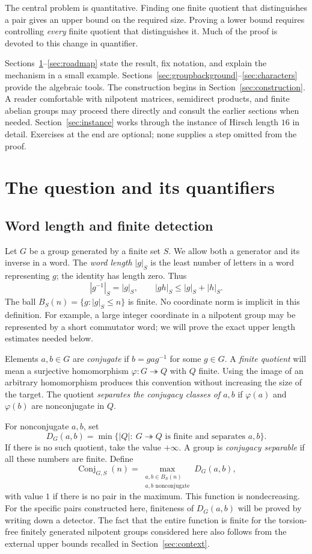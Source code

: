 \documentclass[11pt]{article}
\numberwithin{equation}{section}
\theoremstyle{definition}
\theoremstyle{remark}
\newcommand{\Conj}{\operatorname{Conj}}
\begin{document}
The central problem is quantitative. Finding one finite quotient that distinguishes a pair gives an upper bound on the required size. Proving a lower bound requires controlling \emph{every} finite quotient that distinguishes it. Much of the proof is devoted to this change in quantifier.

Sections~\ref{sec:question}--\ref{sec:roadmap} state the result, fix notation, and explain the mechanism in a small example. Sections~\ref{sec:groupbackground}--\ref{sec:characters} provide the algebraic tools. The construction begins in Section~\ref{sec:construction}. A reader comfortable with nilpotent matrices, semidirect products, and finite abelian groups may proceed there directly and consult the earlier sections when needed. Section~\ref{sec:instance} works through the instance of Hirsch length $16$ in detail. Exercises at the end are optional; none supplies a step omitted from the proof.

\tableofcontents

\section{The question and its quantifiers}\label{sec:question}
\subsection{Word length and finite detection}
Let $G$ be a group generated by a finite set $S$. We allow both a generator and its inverse in a word. The \emph{word length} $|g|_S$ is the least number of letters in a word representing $g$; the identity has length zero. Thus
\[
|g^{-1}|_S=|g|_S,\qquad |gh|_S\le |g|_S+|h|_S.
\]
The ball $B_S(n)=\{g:|g|_S\le n\}$ is finite. No coordinate norm is implicit in this definition. For example, a large integer coordinate in a nilpotent group may be represented by a short commutator word; we will prove the exact upper length estimates needed below.

Elements $a,b\in G$ are \emph{conjugate} if $b=gag^{-1}$ for some $g\in G$. A \emph{finite quotient} will mean a surjective homomorphism $\varphi:G\twoheadrightarrow Q$ with $Q$ finite. Using the image of an arbitrary homomorphism produces this convention without increasing the size of the target. The quotient \emph{separates the conjugacy classes of $a,b$} if $\varphi(a)$ and $\varphi(b)$ are nonconjugate in $Q$.

For nonconjugate $a,b$, set
\[
D_G(a,b)=\min\bigl\{|Q|:\ G\twoheadrightarrow Q\text{ is finite and separates }a,b\bigr\}.
\]
If there is no such quotient, take the value $+\infty$. A group is \emph{conjugacy separable} if all these numbers are finite. Define
\[
\Conj_{G,S}(n)=\max_{\substack{a,b\in B_S(n)\\a,b\text{ nonconjugate}}}D_G(a,b),
\]
with value $1$ if there is no pair in the maximum. This function is nondecreasing. For the specific pairs constructed here, finiteness of $D_G(a,b)$ will be proved by writing down a detector. The fact that the entire function is finite for the torsion-free finitely generated nilpotent groups considered here also follows from the external upper bounds recalled in Section~\ref{sec:context}.
\end{document}
